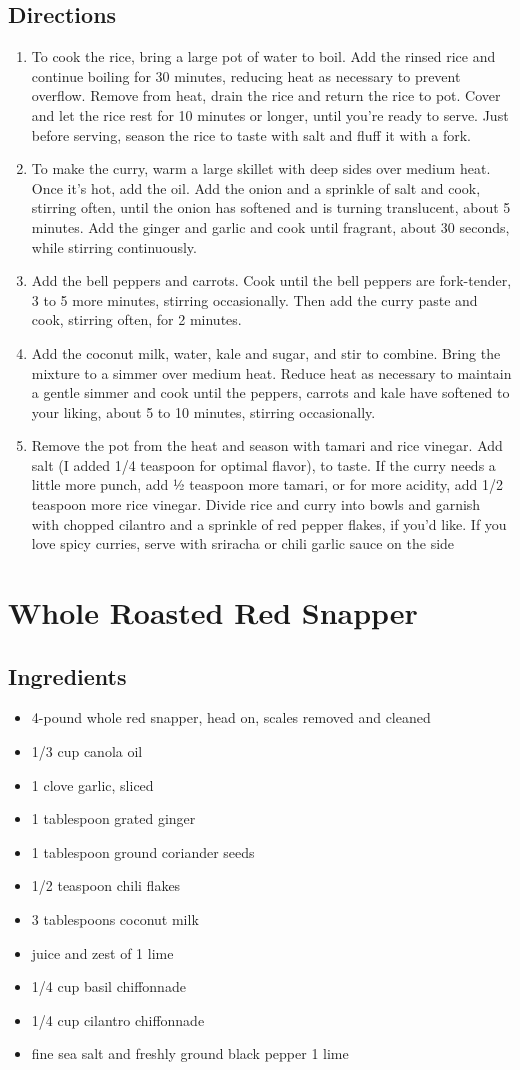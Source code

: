 \documentclass[oneside,11pt]{book}
\newcommand{\Ingredients}[1]{
    \subsection*{Ingredients}
    \begin{itemize} 
      #1 
    \end{itemize}
}
\newcommand{\Directions}[1]{
    \subsection*{Directions}
    \begin{enumerate} 
      #1 
    \end{enumerate}
}
\newcommand{\recipe}[1]{
    \section*{ \hspace{-12pt} #1 }
    \addcontentsline{toc}{section}{ \hspace{-6pt} #1 }
}
\begin{document}
        \Directions{
            \item To cook the rice, bring a large pot of water to boil. 
                Add the rinsed rice and continue boiling for 30 minutes, reducing heat as necessary to prevent overflow. 
                Remove from heat, drain the rice and return the rice to pot. 
                Cover and let the rice rest for 10 minutes or longer, until you're ready to serve. 
                Just before serving, season the rice to taste with salt and fluff it with a fork.
            \item To make the curry, warm a large skillet with deep sides over medium heat. 
                Once it’s hot, add the oil. 
                Add the onion and a sprinkle of salt and cook, stirring often, until the onion has softened and is turning translucent, about 5 minutes. 
                Add the ginger and garlic and cook until fragrant, about 30 seconds, while stirring continuously.
            \item Add the bell peppers and carrots. 
                Cook until the bell peppers are fork-tender, 3 to 5 more minutes, stirring occasionally. 
                Then add the curry paste and cook, stirring often, for 2 minutes.
            \item Add the coconut milk, water, kale and sugar, and stir to combine. 
                Bring the mixture to a simmer over medium heat. 
                Reduce heat as necessary to maintain a gentle simmer and cook until the peppers, carrots and kale have softened to your liking, about 5 to 10 minutes, stirring occasionally.
            \item Remove the pot from the heat and season with tamari and rice vinegar. 
                Add salt (I added 1/4 teaspoon for optimal flavor), to taste. 
                If the curry needs a little more punch, add ½ teaspoon more tamari, or for more acidity, add 1/2 teaspoon more rice vinegar. 
                Divide rice and curry into bowls and garnish with chopped cilantro and a sprinkle of red pepper flakes, if you'd like. 
                If you love spicy curries, serve with sriracha or chili garlic sauce on the side
        }
    
    \recipe{Whole Roasted Red Snapper}
        \Ingredients{
            \item 4-pound whole red snapper, head on, scales removed and cleaned
            \item 1/3 cup canola oil
            \item 1 clove garlic, sliced
            \item 1 tablespoon grated ginger
            \item 1 tablespoon ground coriander seeds
            \item 1/2 teaspoon chili flakes
            \item 3 tablespoons coconut milk
            \item juice and zest of 1 lime
            \item 1/4 cup basil chiffonnade
            \item 1/4 cup cilantro chiffonnade
            \item fine sea salt and freshly ground black pepper 1 lime
        }
        
\end{document}
